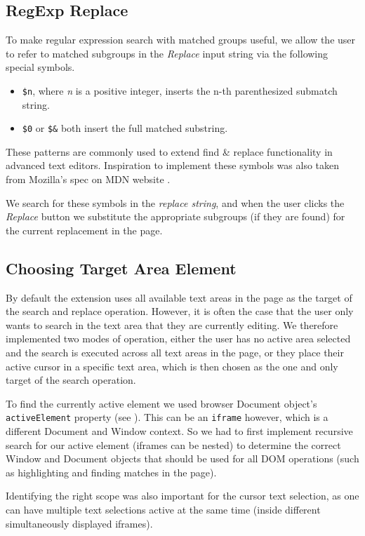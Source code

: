 \documentclass[bsc,frontabs,twoside,singlespacing,parskip,deptreport]{infthesis}
\providecommand{\tightlist}{%
  \setlength{\itemsep}{0pt}\setlength{\parskip}{0pt}}
\begin{document}
\subsection{RegExp Replace}
To make regular expression search with matched groups useful, we allow the user to refer to matched subgroups in the \textit{Replace} input string via the following special symbols.

\begin{itemize}
\tightlist
\item
  \texttt{\$n}, where \textit{n} is a positive integer, inserts the n-th parenthesized submatch string.
\item
  \texttt{\$0} or \texttt{\$\&} both insert the full matched substring.
\end{itemize}

These patterns are commonly used to extend find \& replace functionality in advanced text editors. Inspiration to implement these symbols was also taken from Mozilla's spec on MDN website \cite{M9}.

We search for these symbols in the \textit{replace string}, and when the user clicks the \textit{Replace} button we substitute the appropriate subgroups (if they are found) for the current replacement in the page.

\subsection{Choosing Target Area Element}
By default the extension uses all available text areas in the page as the target of the search and replace operation. However, it is often the case that the user only wants to search in the text area that they are currently editing. We therefore implemented two modes of operation, either the user has no active area selected and the search is executed across all text areas in the page, or they place their active cursor in a specific text area, which is then chosen as the one and only target of the search operation.

To find the currently active element we used browser Document object's \texttt{activeElement} property (see \cite{M10}). This can be an \texttt{iframe} however, which is a different Document and Window context. So we had to first implement recursive search for our active element (iframes can be nested) to determine the correct Window and Document objects that should be used for all DOM operations (such as highlighting and finding matches in the page).

Identifying the right scope was also important for the cursor text selection, as one can have multiple text selections active at the same time (inside different simultaneously displayed iframes).
\end{document}
